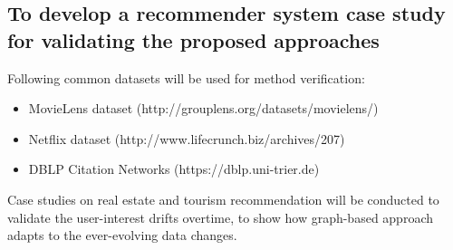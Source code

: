 \subsection{To develop a recommender system case study for validating the proposed approaches}

Following common datasets will be used for method verification: 

\begin{itemize}

\item MovieLens dataset (http://grouplens.org/datasets/movielens/) 

\item Netflix dataset (http://www.lifecrunch.biz/archives/207) 

\item DBLP Citation Networks (https://dblp.uni-trier.de)  

\end{itemize}

Case studies on real estate and tourism recommendation will be conducted to validate the user-interest drifts overtime, to show how graph-based approach adapts to the ever-evolving data changes. 
